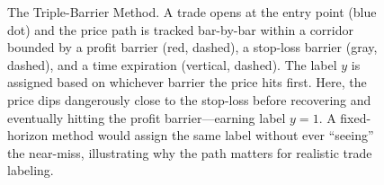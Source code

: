 \begin{figure}[ht]

\caption{%
  The Triple-Barrier Method. A trade opens at the entry point (blue dot) and the
  price path is tracked bar-by-bar within a corridor bounded by a profit barrier
  (red, dashed), a stop-loss barrier (gray, dashed), and a time expiration
  (vertical, dashed). The label $y$ is assigned based on whichever barrier the
  price hits first. Here, the price dips dangerously close to the stop-loss before
  recovering and eventually hitting the profit barrier---earning label $y = 1$.
  A fixed-horizon method would assign the same label without ever ``seeing'' the
  near-miss, illustrating why the path matters for realistic trade labeling.%
}
\label{fig:triple-barrier}
\end{figure}